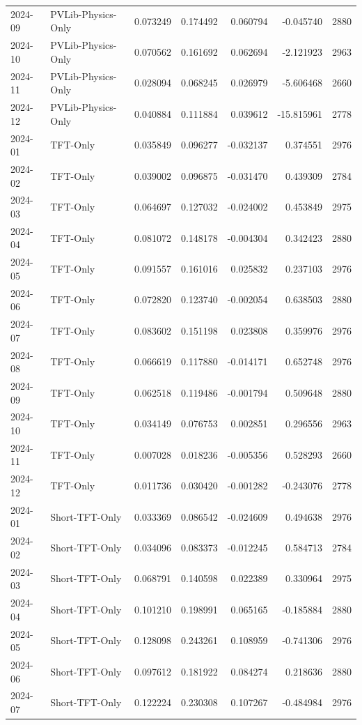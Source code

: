 \begin{tabular}{llrrrrr}
2024-09 & PVLib-Physics-Only & 0.073249 & 0.174492 & 0.060794 & -0.045740 & 2880 \\
2024-10 & PVLib-Physics-Only & 0.070562 & 0.161692 & 0.062694 & -2.121923 & 2963 \\
2024-11 & PVLib-Physics-Only & 0.028094 & 0.068245 & 0.026979 & -5.606468 & 2660 \\
2024-12 & PVLib-Physics-Only & 0.040884 & 0.111884 & 0.039612 & -15.815961 & 2778 \\
2024-01 & TFT-Only & 0.035849 & 0.096277 & -0.032137 & 0.374551 & 2976 \\
2024-02 & TFT-Only & 0.039002 & 0.096875 & -0.031470 & 0.439309 & 2784 \\
2024-03 & TFT-Only & 0.064697 & 0.127032 & -0.024002 & 0.453849 & 2975 \\
2024-04 & TFT-Only & 0.081072 & 0.148178 & -0.004304 & 0.342423 & 2880 \\
2024-05 & TFT-Only & 0.091557 & 0.161016 & 0.025832 & 0.237103 & 2976 \\
2024-06 & TFT-Only & 0.072820 & 0.123740 & -0.002054 & 0.638503 & 2880 \\
2024-07 & TFT-Only & 0.083602 & 0.151198 & 0.023808 & 0.359976 & 2976 \\
2024-08 & TFT-Only & 0.066619 & 0.117880 & -0.014171 & 0.652748 & 2976 \\
2024-09 & TFT-Only & 0.062518 & 0.119486 & -0.001794 & 0.509648 & 2880 \\
2024-10 & TFT-Only & 0.034149 & 0.076753 & 0.002851 & 0.296556 & 2963 \\
2024-11 & TFT-Only & 0.007028 & 0.018236 & -0.005356 & 0.528293 & 2660 \\
2024-12 & TFT-Only & 0.011736 & 0.030420 & -0.001282 & -0.243076 & 2778 \\
2024-01 & Short-TFT-Only & 0.033369 & 0.086542 & -0.024609 & 0.494638 & 2976 \\
2024-02 & Short-TFT-Only & 0.034096 & 0.083373 & -0.012245 & 0.584713 & 2784 \\
2024-03 & Short-TFT-Only & 0.068791 & 0.140598 & 0.022389 & 0.330964 & 2975 \\
2024-04 & Short-TFT-Only & 0.101210 & 0.198991 & 0.065165 & -0.185884 & 2880 \\
2024-05 & Short-TFT-Only & 0.128098 & 0.243261 & 0.108959 & -0.741306 & 2976 \\
2024-06 & Short-TFT-Only & 0.097612 & 0.181922 & 0.084274 & 0.218636 & 2880 \\
2024-07 & Short-TFT-Only & 0.122224 & 0.230308 & 0.107267 & -0.484984 & 2976 \\

\end{tabular}
